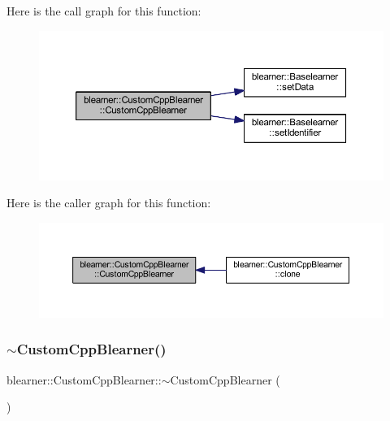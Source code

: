 Here is the call graph for this function\+:
\nopagebreak
\begin{figure}[H]
\begin{center}
\leavevmode
\includegraphics[width=350pt]{classblearner_1_1_custom_cpp_blearner_a053eccfff8223ab0358b7f00ed02d263_cgraph}
\end{center}
\end{figure}
Here is the caller graph for this function\+:
\nopagebreak
\begin{figure}[H]
\begin{center}
\leavevmode
\includegraphics[width=350pt]{classblearner_1_1_custom_cpp_blearner_a053eccfff8223ab0358b7f00ed02d263_icgraph}
\end{center}
\end{figure}
\mbox{\label{classblearner_1_1_custom_cpp_blearner_a4e26b5c9da2eaff19a21de8fdb534bc5}} 
\subsubsection{\texorpdfstring{$\sim$\+Custom\+Cpp\+Blearner()}{~CustomCppBlearner()}}
{\footnotesize\ttfamily blearner\+::\+Custom\+Cpp\+Blearner\+::$\sim$\+Custom\+Cpp\+Blearner (\begin{DoxyParamCaption}{ }\end{DoxyParamCaption})}



